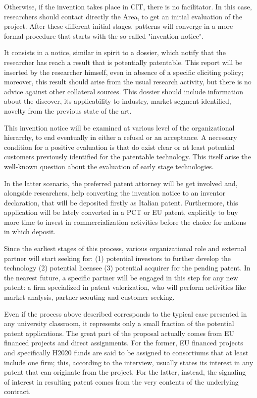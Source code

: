 Otherwise, if the invention takes place in CIT, there is no facilitator. In this case, researchers should contact directly the Area, to get an initial evaluation of the project. After these different initial stages, patterns will converge in a more formal procedure that starts with the so-called "invention notice". 

It consists in a notice, similar in spirit to a dossier, which notify that the researcher has reach a result that is potentially patentable. This report will be inserted by the researcher himself, even in absence of a specific eliciting policy; moreover, this result should arise from the usual research activity, but there is no advice against other collateral sources. This dossier should include information about the discover, its applicability to industry, market segment identified, novelty from the previous state of the art. 

This invention notice will be examined at various level of the organizational hierarchy, to end eventually in either a refusal or an acceptance.  A necessary condition for a positive evaluation is that do exist clear or at least potential customers previously identified for the patentable technology. This itself arise the well-known question about the evaluation of early stage technologies.

In the latter scenario, the preferred patent attorney will be get involved and, alongside researchers, help converting the invention notice to an inventor declaration, that will be deposited firstly as Italian patent. Furthermore, this application will be lately converted in a PCT or EU patent, explicitly to buy more time to invest in commercialization activities before the choice for nations in which deposit. 

Since the earliest stages of this process, various organizational role and external partner will start seeking for: (1) potential investors to further develop the technology (2) potential licensee (3) potential acquirer for the pending patent. In the nearest future, a specific partner will be engaged in this step for any new patent: a firm specialized in patent valorization, who will perform activities like market analysis, partner scouting and customer seeking. 

Even if the process above described corresponds to the typical case presented in any university classroom, it represents only a small fraction of the potential patent applications. The great part of the proposal actually comes from EU financed projects and direct assignments. For the former, EU financed projects and specifically H2020 funds are said to be assigned to consortiums that at least include one firm; this, according to the interview, usually states its interest in any patent that can originate from the project. For the latter, instead, the signaling of interest in resulting patent comes from the very contents of the underlying contract.

